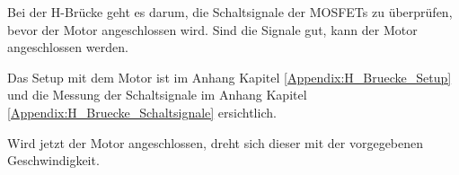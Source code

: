Bei der H-Brücke geht es darum, die Schaltsignale der MOSFETs zu überprüfen, bevor der Motor angeschlossen wird. Sind die Signale gut, kann der Motor angeschlossen werden.

Das Setup mit dem Motor ist im Anhang Kapitel \ref{Appendix:H_Bruecke_Setup} und die Messung der Schaltsignale im Anhang Kapitel \ref{Appendix:H_Bruecke_Schaltsignale} ersichtlich.

Wird jetzt der Motor angeschlossen, dreht sich dieser mit der vorgegebenen Geschwindigkeit.